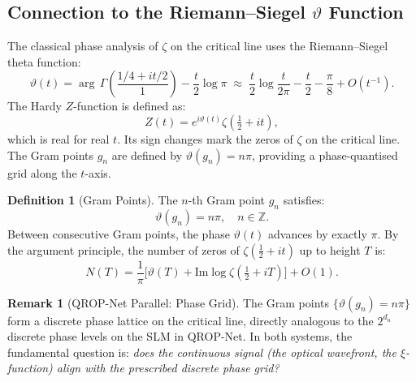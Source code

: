\documentclass[11pt, a4paper]{article}
\theoremstyle{definition}
\newtheorem{definition}{Definition}[section]
\newtheorem{remark}{Remark}[section]
\theoremstyle{plain}
\newcommand{\xif}{\xi}                      %
\begin{document}
\subsection{Connection to the Riemann--Siegel $\vartheta$ Function}

The classical phase analysis of $\zeta$ on the critical line uses the
Riemann--Siegel theta function:
\begin{equation}
  \vartheta(t) = \arg\,\Gamma\!\left(\frac{1/4 + it/2}{1}\right) -
  \frac{t}{2}\log\pi
  \;\approx\;
  \frac{t}{2}\log\frac{t}{2\pi} - \frac{t}{2} - \frac{\pi}{8} +
  O(t^{-1}).
  \label{eq:riemann_siegel_theta}
\end{equation}
The Hardy $Z$-function is defined as:
\begin{equation}
  Z(t) = e^{i\vartheta(t)}\zeta(\tfrac{1}{2}+it),
  \label{eq:hardy_z}
\end{equation}
which is real for real $t$. Its sign changes mark the zeros of $\zeta$
on the critical line. The Gram points $g_n$ are defined by
$\vartheta(g_n) = n\pi$, providing a phase-quantised grid along the
$t$-axis.

\begin{definition}[Gram Points]
\label{def:gram}
The $n$-th Gram point $g_n$ satisfies:
\begin{equation}
  \vartheta(g_n) = n\pi, \quad n \in \mathbb{Z}.
  \label{eq:gram_points}
\end{equation}
Between consecutive Gram points, the phase $\vartheta(t)$ advances by
exactly $\pi$. By the argument principle, the number of zeros of
$\zeta(\tfrac{1}{2}+it)$ up to height $T$ is:
\begin{equation}
  N(T) = \frac{1}{\pi}\Big[\vartheta(T) +
  \mathrm{Im}\log\zeta(\tfrac{1}{2}+iT)\Big] + O(1).
  \label{eq:zero_counting}
\end{equation}
\end{definition}

\begin{remark}[QROP-Net Parallel: Phase Grid]
\label{rem:gram_grid}
The Gram points $\{\vartheta(g_n) = n\pi\}$ form a discrete phase
lattice on the critical line, directly analogous to the $2^{d_u}$
discrete phase levels on the SLM in QROP-Net. In both systems, the
fundamental question is: \textit{does the continuous signal (the optical
wavefront, the $\xif$-function) align with the prescribed discrete
phase grid?}
\end{remark}


\end{document}
